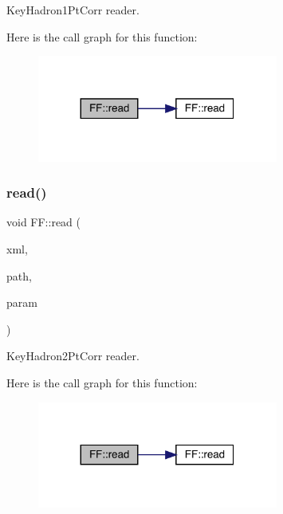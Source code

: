 Key\+Hadron1\+Pt\+Corr reader. 

Here is the call graph for this function\+:
\nopagebreak
\begin{figure}[H]
\begin{center}
\leavevmode
\includegraphics[width=224pt]{d5/da6/namespaceFF_acb4db5dbe27937736b4f2cbed9694c56_cgraph}
\end{center}
\end{figure}
\mbox{\label{namespaceFF_ac879699f10e046e5a2059a2efcf1408b}} 
\subsubsection{\texorpdfstring{read()}{read()}\hspace{0.1cm}{\footnotesize\ttfamily [3/14]}}
{\footnotesize\ttfamily void F\+F\+::read (\begin{DoxyParamCaption}\item[{X\+M\+L\+Reader \&}]{xml,  }\item[{const std\+::string \&}]{path,  }\item[{\mbox{\hyperlink{structFF_1_1KeyHadron2PtCorr__t}{Key\+Hadron2\+Pt\+Corr\+\_\+t}} \&}]{param }\end{DoxyParamCaption})}



Key\+Hadron2\+Pt\+Corr reader. 

Here is the call graph for this function\+:
\nopagebreak
\begin{figure}[H]
\begin{center}
\leavevmode
\includegraphics[width=224pt]{d5/da6/namespaceFF_ac879699f10e046e5a2059a2efcf1408b_cgraph}
\end{center}
\end{figure}
\mbox{\label{namespaceFF_ab0ac23f91d1403059f1df825a7ab775f}} 
